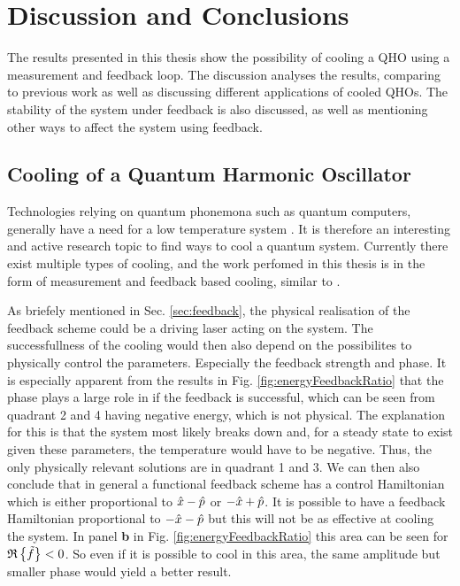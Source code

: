 \section{Discussion and Conclusions}
The results presented in this thesis show the possibility of cooling a QHO using a measurement and feedback loop. The discussion analyses the results, comparing to previous work as well as discussing different applications of cooled QHOs. The stability of the system under feedback is also discussed, as well as mentioning other ways to affect the system using feedback. 

\subsection{Cooling of a Quantum Harmonic Oscillator}
Technologies relying on quantum phonemona such as quantum computers, generally have a need for a low temperature system \cite{Nielsen:2010}. It is therefore an interesting and active research topic to find ways to cool a quantum system. Currently there exist multiple types of cooling, and the work perfomed in this thesis is in the form of measurement and feedback based cooling, similar to \cite{De-Sousa:2025}.

As briefely mentioned in Sec. \ref{sec:feedback}, the physical realisation of the feedback scheme could be a driving laser acting on the system. The successfullness of the cooling would then also depend on the possibilites to physically control the parameters. Especially the feedback strength and phase. It is especially apparent from the results in Fig. \ref{fig:energyFeedbackRatio} that the phase plays a large role in if the feedback is successful, which can be seen from quadrant 2 and 4 having negative energy, which is not physical. The explanation for this is that the system most likely breaks down and, for a steady state to exist given these parameters, the temperature would have to be negative. Thus, the only physically relevant solutions are in quadrant 1 and 3. We can then also conclude that in general a functional feedback scheme has a control Hamiltonian which is either proportional to $\hat{x} - \hat{p}$ or $-\hat{x} + \hat{p}$. It is possible to have a feedback Hamiltonian proportional to $-\hat{x} - \hat{p}$ but this will not be as effective at cooling the system. In panel \textbf{b} in Fig. \ref{fig:energyFeedbackRatio} this area can be seen for $\mathfrak{R}\left\{\tilde{f}\right\} < 0$. So even if it is possible to cool in this area, the same amplitude but smaller phase would yield a better result.

